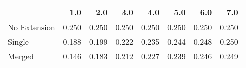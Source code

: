 \begin{tabular}{lrrrrrrr}
\toprule
{} &   1.0 &   2.0 &   3.0 &   4.0 &   5.0 &   6.0 &   7.0 \\
\midrule
No Extension & 0.250 & 0.250 & 0.250 & 0.250 & 0.250 & 0.250 & 0.250 \\
Single       & 0.188 & 0.199 & 0.222 & 0.235 & 0.244 & 0.248 & 0.250 \\
Merged       & 0.146 & 0.183 & 0.212 & 0.227 & 0.239 & 0.246 & 0.249 \\
\bottomrule
\end{tabular}
